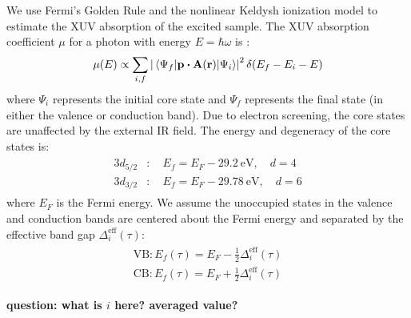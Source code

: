 We use Fermi's Golden Rule and the nonlinear Keldysh ionization model to estimate the XUV absorption of the excited sample. The XUV absorption coefficient $\mu$ for a photon with energy $E = \hbar \omega$ is \cite{rehrTheoreticalApproachesXray2000}:
\begin{equation}
\mu (E) \propto \sum_{i,f} \left| \mel{\Psi_f}{ \vb{p} \vdot \vb{A}(\vb{r}) }{\Psi_i} \right|^2 \delta(E_f - E_i - E)
\label{eqn:Fermis_Golden_Rule}
\end{equation}
where $\Psi_i$ represents the initial core state and $\Psi_f$ represents the final state (in either the valence or conduction band). Due to electron screening, the core states are unaffected by the external IR field. The energy and degeneracy of the core states is:
\begin{align}
\begin{split}
3d_{5/2}&: \quad E_f = E_F - 29.2 \ \textrm{eV}, \quad d = 4  \\
3d_{3/2}&: \quad E_f = E_F - 29.78 \ \textrm{eV}, \quad d = 6
\end{split}
\end{align}
where $E_F$ is the Fermi energy. We assume the unoccupied states in the valence and conduction bands are centered about the Fermi energy and separated by the effective band gap $\Delta_i^{\textrm{eff}}(\tau)$:
\begin{align}
\begin{split}
\textrm{VB}: E_f(\tau) = E_F - \frac{1}{2} \Delta_i^{\textrm{eff}}(\tau) \\
\textrm{CB}: E_f(\tau) = E_F + \frac{1}{2} \Delta_i^{\textrm{eff}}(\tau)
\end{split}
\end{align}

\textbf{question: what is $i$ here? averaged value?}


